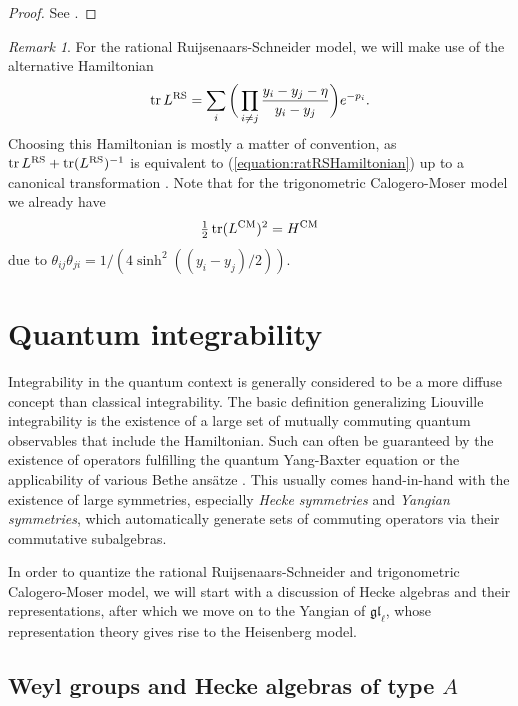 \documentclass[11pt]{report}
\theoremstyle{definition}
\theoremstyle{remark}
\newtheorem*{remark}{Remark}
\theoremstyle{remark}
\begin{document}
\begin{proof}
See \cite{book:arutyunov:elements}.
\end{proof}

\begin{remark}
For the rational Ruijsenaars-Schneider model, we will make use of the alternative Hamiltonian
\begin{equation}\label{equation:ratRSHamiltonianPrime}
\operatorname{tr} L^\textnormal{RS} = \sum_i \bigg( \prod_{i \neq j} \frac{y_i-y_j-\eta}{y_i-y_j} \bigg) e^{-p_i}.
\end{equation}
Choosing this Hamiltonian is mostly a matter of convention, as $\operatorname{tr} L^\textnormal{RS} + \operatorname{tr}(L^\textnormal{RS})^{-1}$ is equivalent to (\ref{equation:ratRSHamiltonian}) up to a canonical transformation \cite{book:arutyunov:elements}. Note that for the trigonometric Calogero-Moser model we already have
\begin{equation*}
\tfrac{1}{2} \operatorname{tr} (L^\textnormal{CM})^2 = H^\textnormal{CM}
\end{equation*}
due to $\theta_{ij} \theta_{ji} = 1/(4 \sinh^2((y_i-y_j)/2))$.
\end{remark}

\section{Quantum integrability}

Integrability in the quantum context is generally considered to be a more diffuse concept than classical integrability. The basic definition generalizing Liouville integrability is the existence of a large set of mutually commuting quantum observables that include the Hamiltonian. Such can often be guaranteed by the existence of operators fulfilling the quantum Yang-Baxter equation or the applicability of various Bethe ansätze \cite{book:arutyunov:betheAnsatz}. This usually comes hand-in-hand with the existence of large symmetries, especially \emph{Hecke symmetries} and \emph{Yangian symmetries}, which automatically generate sets of commuting operators via their commutative subalgebras.

In order to quantize the rational Ruijsenaars-Schneider and trigonometric Calogero-Moser model, we will start with a discussion of Hecke algebras and their representations, after which we move on to the Yangian of $\mathfrak{gl}_\ell$, whose representation theory gives rise to the Heisenberg model.

\subsection{Weyl groups and Hecke algebras of type $A$}
\end{document}

